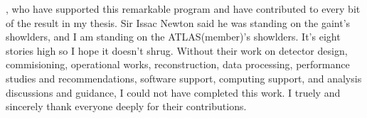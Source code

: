 




, who have supported this remarkable program and have contributed to every bit of the result in my thesis. Sir Issac Newton said he was standing on the gaint's showlders, and I am standing on the ATLAS(member)'s showlders. It's eight stories high so I hope it doesn't shrug. Without their work on detector design, commisioning, operational works, reconstruction, data processing, performance studies and recommendations, software support, computing support, and analysis discussions and guidance, I could not have completed this work. I truely and sincerely thank everyone deeply for their contributions.


